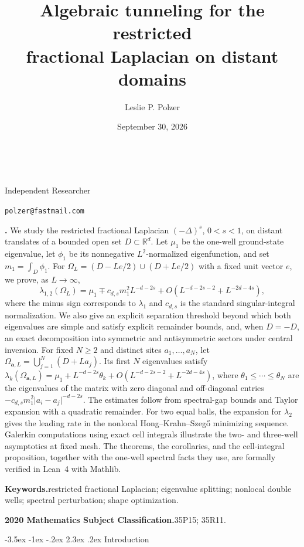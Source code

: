 \documentclass[twoside,10pt]{article}
\title{Algebraic tunneling for the restricted\\
fractional Laplacian on distant domains}
\author{Leslie P. Polzer}
\date{September 30, 2026}
\makeatletter
\numberwithin{equation}{section}
\theoremstyle{slbody}
\theoremstyle{definition}
\newcommand{\authoraffiliation}{Independent Researcher}
\newcommand{\authoremail}{polzer@fastmail.com}
\renewcommand{\section}{%
  \@startsection{section}{1}{\z@}%
    {-3.5ex \@plus -1ex \@minus -.2ex}%
    {2.3ex \@plus .2ex}%
    {\normalfont\large\bfseries}}
\renewcommand{\maketitle}{%
  \begin{center}
    {\large\bfseries\@title}\\
    \vskip24pt
    \ifx\@author\@empty
      \mbox{}\par
    \else
      {\scshape\@author}\par
      \medskip
      {\small\authoraffiliation}\par
      \smallskip
      {\small\texttt{\authoremail}}\par
      \smallskip
      {\small\@date}\par
    \fi
    \vskip24pt
  \end{center}}
\renewenvironment{abstract}
  {\quotation\noindent\small{\bfseries\abstractname.\enspace}}
  {\endquotation}
\makeatother
\begin{document}
\maketitle

\begin{abstract}
We study the restricted fractional Laplacian $(-\Delta)^s$, $0<s<1$, on
distant translates of a bounded open set $D\subset\mathbb R^d$.
Let $\mu_1$ be the one-well ground-state eigenvalue, let $\phi_1$ be its
nonnegative $L^2$-normalized eigenfunction, and set $m_1=\int_D\phi_1$.
For $\Omega_L=(D-Le/2)\cup(D+Le/2)$ with a fixed unit vector $e$, we prove,
as $L\to\infty$,
\[
 \lambda_{1,2}(\Omega_L)=\mu_1\mp c_{d,s}m_1^2L^{-d-2s}
 +O(L^{-d-2s-2}+L^{-2d-4s}),
\]
where the minus sign corresponds to $\lambda_1$ and $c_{d,s}$ is the standard
singular-integral normalization.  We also give an explicit separation
threshold beyond which both eigenvalues are simple and satisfy explicit
remainder bounds, and, when $D=-D$, an exact decomposition into symmetric and
antisymmetric sectors under central inversion.  For fixed $N\geq2$ and distinct sites
$a_1,\ldots,a_N$, let
$\Omega_{\mathbf a,L}=\bigcup_{j=1}^N(D+La_j)$.  Its first $N$ eigenvalues satisfy
$\lambda_k(\Omega_{\mathbf a,L})=\mu_1+L^{-d-2s}\theta_k
+O(L^{-d-2s-2}+L^{-2d-4s})$, where
$\theta_1\leq\cdots\leq\theta_N$ are the eigenvalues of the matrix with zero
diagonal and off-diagonal entries
$-c_{d,s}m_1^2\lvert a_i-a_j\rvert^{-d-2s}$.  The estimates follow from
spectral-gap bounds and Taylor expansion with a quadratic remainder.
For two equal balls, the expansion for $\lambda_2$ gives the leading rate
in the nonlocal Hong--Krahn--Szeg\H{o} minimizing sequence.
Galerkin computations using exact cell integrals illustrate the two- and
three-well asymptotics at fixed mesh.  The theorems, the corollaries, and the
cell-integral proposition, together with the one-well spectral facts they use,
are formally verified in Lean~4 with Mathlib.

\vskip5pt
\noindent\textbf{Keywords.}\enspace restricted fractional Laplacian;
eigenvalue splitting; nonlocal double wells; spectral perturbation; shape
optimization.

\vskip5pt
\noindent\textbf{2020 Mathematics Subject Classification.}\enspace 35P15; 35R11.
\end{abstract}

\vskip24pt
\baselineskip=13.5pt
\section{Introduction}
\end{document}
